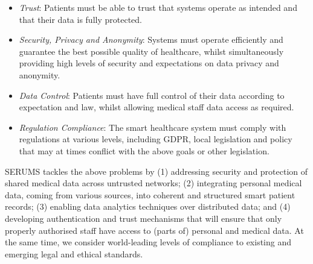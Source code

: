 \begin{itemize}
    \item \emph{Trust}: Patients must be able to trust that systems operate as intended and that their data is fully protected.
    \item \emph{Security, Privacy and Anonymity}: Systems must operate efficiently and guarantee  the best possible quality of healthcare, whilst simultaneously providing high levels of security and expectations on data privacy and anonymity.
    \item \emph{Data Control}: Patients must have full control of their data according to expectation and law, whilst allowing medical staff data access as required.
    \item \emph{Regulation Compliance}: The smart healthcare system must comply with regulations at various levels, including 
    GDPR, local legislation and policy that may at times conflict with the above goals or other legislation.
\end{itemize}
SERUMS tackles the above problems by (1) addressing security and protection of shared medical data across untrusted networks;
(2) integrating personal medical data, coming from various sources, into coherent and structured smart patient records;
(3) enabling data analytics techniques over distributed data; and
(4) developing authentication and trust mechanisms that will ensure that only properly authorised staff have access to (parts of) personal and medical data. At the same time, we consider
world-leading levels of compliance to existing and emerging legal and ethical standards.

